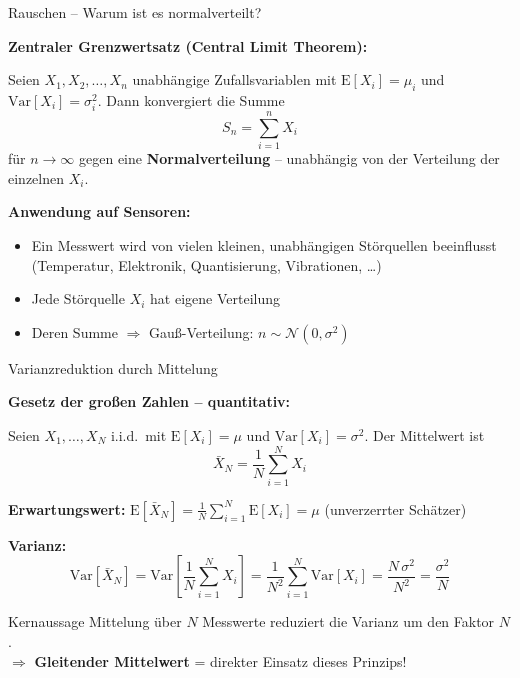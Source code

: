 \documentclass[%
  aspectratio=169,
  10pt
]{beamer}
\newcommand{\hl}[1]{{\color{fbblau}\textbf{#1}}}
\begin{document}
\begin{frame}{Rauschen -- Warum ist es normalverteilt?}

\textbf{Zentraler Grenzwertsatz (Central Limit Theorem):}

Seien $X_1, X_2, \ldots, X_n$ unabhängige Zufallsvariablen mit
$\mathrm{E}[X_i] = \mu_i$ und $\mathrm{Var}[X_i] = \sigma_i^2$.
Dann konvergiert die Summe
\[
  S_n = \sum_{i=1}^{n} X_i
\]
für $n \to \infty$ gegen eine \hl{Normalverteilung} -- unabhängig
von der Verteilung der einzelnen $X_i$.

\vspace{2mm}
\textbf{Anwendung auf Sensoren:}
\begin{itemize}
  \item Ein Messwert wird von vielen kleinen, unabhängigen
        Störquellen beeinflusst (Temperatur, Elektronik,
        Quantisierung, Vibrationen, \ldots)
  \item Jede Störquelle $X_i$ hat eigene Verteilung
  \item Deren Summe $\Rightarrow$ Gauß-Verteilung:
        $n \sim \mathcal{N}(0, \sigma^2)$
\end{itemize}

\end{frame}


\begin{frame}{Varianzreduktion durch Mittelung}

\textbf{Gesetz der großen Zahlen -- quantitativ:}

Seien $X_1, \ldots, X_N$ i.i.d.\ mit $\mathrm{E}[X_i] = \mu$ und
$\mathrm{Var}[X_i] = \sigma^2$. Der Mittelwert ist
\[
  \bar{X}_N = \frac{1}{N}\sum_{i=1}^{N} X_i
\]

\pause
\textbf{Erwartungswert:}
$\mathrm{E}[\bar{X}_N] = \frac{1}{N}\sum_{i=1}^N \mathrm{E}[X_i]
  = \mu$ \quad (unverzerrter Schätzer)

\pause
\textbf{Varianz:}
\[
  \mathrm{Var}[\bar{X}_N]
  = \mathrm{Var}\!\left[\frac{1}{N}\sum_{i=1}^N X_i\right]
  = \frac{1}{N^2}\sum_{i=1}^N \mathrm{Var}[X_i]
  = \frac{N\,\sigma^2}{N^2}
  = \frac{\sigma^2}{N}
\]

\pause
\begin{block}{Kernaussage}
  Mittelung über $N$ Messwerte reduziert die Varianz um den Faktor $N$.\\
  $\Rightarrow$ \textbf{Gleitender Mittelwert} = direkter Einsatz dieses Prinzips!
\end{block}

\end{frame}
\end{document}
